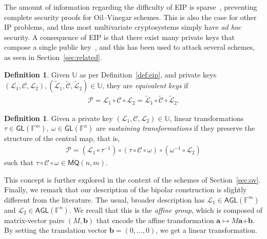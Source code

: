 \documentclass[12pt, a4paper, oneside]{memoir}
\theoremstyle{definition}
\newtheorem{definition}[theorem]{Definition}
\begin{document}
The amount of information regarding the difficulty of EIP is sparse~\cite[p.~69]{Thomae:201306}, preventing complete security proofs for Oil--Vinegar schemes. This is also the case for other IP problems, and thus most multivariate cryptosystems simply have \emph{ad hoc} security. A consequence of EIP is that there exist many private keys that compose a single public key~\cite{Wolf:201104}, and this has been used to attack several schemes, as seen in Section~\ref{sec:related}.

\begin{definition}
  Given $\mathbb{U}$ as per Definition~\ref{def:eip}, and private keys $(\mathcal{L}_{1}, \mathcal{C}, \mathcal{L}_{2}), (\widetilde{\mathcal{L}}_{1}, \widetilde{\mathcal{C}}, \widetilde{\mathcal{L}}_{2}) \in \mathbb{U}$, they are \emph{equivalent keys} if
  \begin{align}
    \mathcal{P} = \mathcal{L}_{1} \circ \mathcal{C} \circ \mathcal{L}_{2}
      = \widetilde{\mathcal{L}}_{1} \circ \widetilde{\mathcal{C}} \circ \widetilde{\mathcal{L}}_{2}.
  \end{align}
\end{definition}

\begin{definition}\label{def:sustainer}
  Given a private key $(\mathcal{L}_{1}, \mathcal{C}, \mathcal{L}_{2}) \in \mathbb{U}$, linear transformations $\tau \in \mathsf{GL}(\mathbb{F}^{m}),\: \omega \in \mathsf{GL}(\mathbb{F}^{n})$ are \emph{sustaining transformations} if they preserve the structure of the central map, that is,
  \begin{align}
    \mathcal{P} = (\mathcal{L}_{1} \circ \tau^{-1}) \circ (\tau \circ \mathcal{C} \circ \omega) \circ (\omega^{-1} \circ \mathcal{L}_{2})
  \end{align}
  such that $\tau \circ \mathcal{C} \circ \omega \in \overline{\mathsf{MQ}}(n, m)$.
\end{definition}

This concept is further explored in the context of the schemes of Section~\ref{sec:ov}. Finally, we remark that our description of the bipolar construction is slightly different from the literature. The usual, broader description has $\mathcal{L}_{1} \in \mathsf{AGL}(\mathbb{F}^{m})$ and $\mathcal{L}_{2} \in \mathsf{AGL}(\mathbb{F}^{n})$. We recall that this is the \emph{affine group}, which is composed of matrix-vector pairs $(M, \mathbf{b})$ that encode the affine transformation $\mathbf{a} \mapsto M\mathbf{a} \bm{+} \mathbf{b}$. By setting the translation vector $\mathbf{b} = (0, \dots, 0)$, we get a linear transformation.
\end{document}
